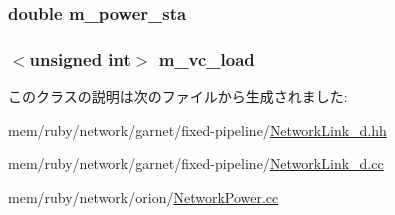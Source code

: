 \label{classNetworkLink__d_a09287c991c636cbc01e82cd7d3f73dc2}
\hypertarget{classNetworkLink__d_afe7b7b86afd10caa5129c26f7428e2b1}{
\subsubsection[{m\_\-power\_\-sta}]{\setlength{\rightskip}{0pt plus 5cm}double {\bf m\_\-power\_\-sta}}}
\label{classNetworkLink__d_afe7b7b86afd10caa5129c26f7428e2b1}
\hypertarget{classNetworkLink__d_a929bb11421a47667a05e8e94e6d8ccd2}{
\subsubsection[{m\_\-vc\_\-load}]{$<$unsigned int$>$ {\bf m\_\-vc\_\-load}}}
\label{classNetworkLink__d_a929bb11421a47667a05e8e94e6d8ccd2}


このクラスの説明は次のファイルから生成されました:\begin{DoxyCompactItemize}
\item 
mem/ruby/network/garnet/fixed-\/pipeline/\hyperlink{NetworkLink__d_8hh}{NetworkLink\_\-d.hh}\item 
mem/ruby/network/garnet/fixed-\/pipeline/\hyperlink{NetworkLink__d_8cc}{NetworkLink\_\-d.cc}\item 
mem/ruby/network/orion/\hyperlink{NetworkPower_8cc}{NetworkPower.cc}\end{DoxyCompactItemize}
